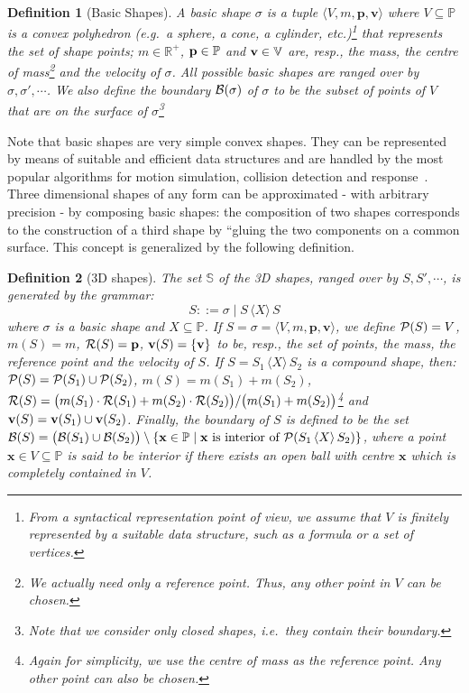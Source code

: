 \documentclass[11pt]{article}
\newcommand{\shapes}{\mathbb{S}}
\newcommand{\real}{\mathbb{R}}
\newcommand{\gor}{\;\big|\;}
\newcommand{\union}[1]{\ensuremath{\,\langle #1 \rangle\,}}
\newcommand{\pos}{{\mathbb P}}
\newcommand{\vel}{{\mathbb V}}
\newcommand{\bs}[4]{\ensuremath{\langle #1, #2, #3, \mathbf{#4}
\rangle}}
\newcommand{\boundary}[1]{\ensuremath{{\cal B}(#1)}}
\newcommand{\points}[1]{\ensuremath{{\cal P}(#1)}}
\newcommand{\velocity}[1]{{\bf v}(#1)}
\newcommand{\mass}[1]{m(#1)}
\newcommand{\referencepoint}[1]{\ensuremath{{\cal R}(#1)}}
\newtheorem{definition}{Definition}
\begin{document}
\begin{definition}[Basic Shapes]
\label{def:bshapes}
A basic shape $\sigma$ is a tuple $\bs{V}{m}{\mathbf{p}}{v}$ where $V \subseteq \pos$ is a {\em convex polyhedron} (e.g.\ a \emph{sphere}, a \emph{cone}, a \emph{cylinder}, etc.)\footnote{From a syntactical representation point of view, we assume that $V$ is finitely represented by a suitable data structure, such as a formula or a set of vertices.} that represents the set of shape points; $m \in \real^+$, ${\bf p} \in \pos$ and ${\bf v} \in \vel$ are, resp., the mass, the centre of mass\footnote{We actually need only a reference point. Thus, any other point in $V$ can be chosen.} and the velocity of $\sigma$. All possible basic shapes are ranged over by $\sigma, \sigma', \cdots$. We also define the {\em boundary} $\boundary{\sigma}$ of $\sigma$ to be the subset of points of $V$ that are on the surface of $\sigma$\footnote{Note that we consider only closed shapes, i.e.\ they contain their boundary.}
\end{definition}

Note that basic shapes are very simple convex shapes. They can be represented by means of suitable and efficient data structures and are handled by the most popular algorithms for motion simulation, collision detection and response~\cite{Ericson2005}. Three dimensional shapes of any form can be approximated - with arbitrary precision - by composing basic shapes: the composition of two shapes corresponds to the construction of a third shape by ``gluing the two components on a common surface. This concept is generalized by the following definition.

\begin{definition}[3D shapes]
\label{def:shapes}
The set $\shapes$ of the  {\em 3D shapes}, ranged over by $S, S', \cdots$, is generated by the grammar:
$$S ::= \sigma \gor  S \union{X} S $$
where $\sigma$ is a basic shape and $X \subseteq \pos$. If $S = \sigma = \bs{V}{m}{\mathbf{p}}{v}$, we define $\points{S} = V$, $\mass{S} = m$, $\referencepoint{S} = {\bf p}$,  $\velocity{S} = \{ {\bf v}\}$ to be, resp., the {\em set of points}, the {\em mass}, the {\em reference point} and the {\em velocity} of $S$. If $S = S_1 \union{X} S_2$  is a compound shape, then: $\points{S} = \points{S_1} \cup \points{S_2}$, $\mass{S} = \mass{S_1} + \mass{S_2}$, $\referencepoint{S} = \big(\mass{S_1}\cdot \referencepoint{S_1} + \mass{S_2} \cdot \referencepoint{S_2}\big) / \big( \mass{S_1} + \mass{S_2} \big)$\footnote{Again for simplicity, we use the centre of mass as the reference point. Any other point can also be chosen.} and $\velocity{S} = \velocity{S_1} \cup \velocity{S_2}$. Finally, the boundary of $S$ is defined to be the set $\boundary{S} = \big( \boundary{S_1} \cup \boundary{S_2}\big) \setminus \{ \mathbf{x} \in \pos \mid \mathbf{x} \mbox{ is interior of } \points{S_1 \union{X} S_2} \}$, where a point $\mathbf{x} \in V \subseteq \pos$ is said to be \emph{interior} if there exists an open ball with centre $\mathbf{x}$ which is completely contained in $V$.
\end{definition}
\end{document}
